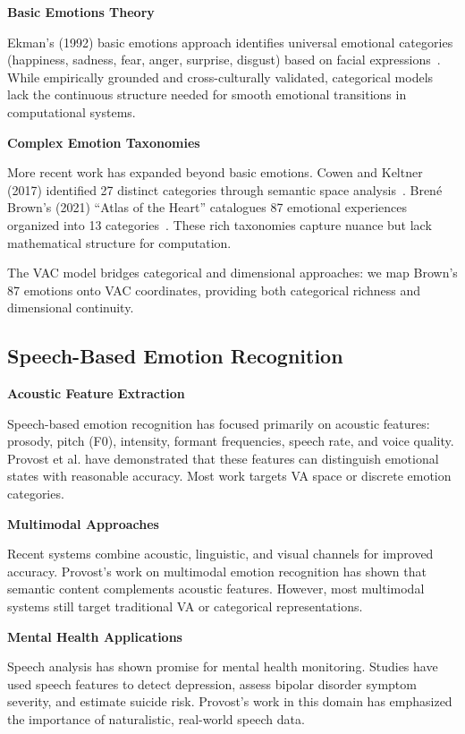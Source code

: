 \textbf{Basic Emotions Theory}

Ekman's (1992) basic emotions approach identifies universal emotional categories (happiness, sadness, fear, anger, surprise, disgust) based on facial expressions~\cite{ekman1992}. While empirically grounded and cross-culturally validated, categorical models lack the continuous structure needed for smooth emotional transitions in computational systems.

\textbf{Complex Emotion Taxonomies}

More recent work has expanded beyond basic emotions. Cowen and Keltner (2017) identified 27 distinct categories through semantic space analysis~\cite{cowen2017}. Brené Brown's (2021) ``Atlas of the Heart'' catalogues 87 emotional experiences organized into 13 categories~\cite{brown2021}. These rich taxonomies capture nuance but lack mathematical structure for computation.

The VAC model bridges categorical and dimensional approaches: we map Brown's 87 emotions onto VAC coordinates, providing both categorical richness and dimensional continuity.

\subsection{Speech-Based Emotion Recognition}

\textbf{Acoustic Feature Extraction}

Speech-based emotion recognition has focused primarily on acoustic features: prosody, pitch (F0), intensity, formant frequencies, speech rate, and voice quality. Provost et al. have demonstrated that these features can distinguish emotional states with reasonable accuracy. Most work targets VA space or discrete emotion categories.

\textbf{Multimodal Approaches}

Recent systems combine acoustic, linguistic, and visual channels for improved accuracy. Provost's work on multimodal emotion recognition has shown that semantic content complements acoustic features. However, most multimodal systems still target traditional VA or categorical representations.

\textbf{Mental Health Applications}

Speech analysis has shown promise for mental health monitoring. Studies have used speech features to detect depression, assess bipolar disorder symptom severity, and estimate suicide risk. Provost's work in this domain has emphasized the importance of naturalistic, real-world speech data.

